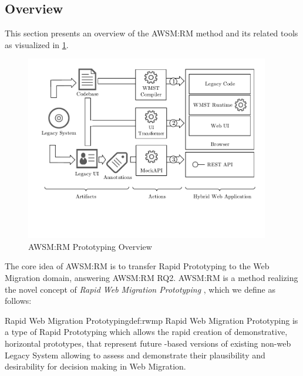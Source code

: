 \vspace{-10pt}
\hypertarget{sec:rwmp.overview}{%
\subsection{Overview}\label{sec:rwmp.overview}}
\vspace{10pt}

This section presents an overview of the AWSM:RM method and its related tools as visualized in \cref{fig:awsm.rm.overview}.

\begin{figure}[h!]
\hypertarget{fig:awsm.rm.overview}{%
\centering
\includegraphics[width=0.95\textwidth]{../figures/rewamp/wms3.pdf}
\caption{AWSM:RM Prototyping Overview}\label{fig:awsm.rm.overview}
}
\end{figure}

The core idea of AWSM:RM is to transfer \gls{Rapid Prototyping} to the \gls{Web Migration} domain, answering AWSM:RM RQ2.
AWSM:RM is a method realizing the novel concept of \emph{\gls{Rapid Web Migration Prototyping}} \autocite{Heil2018ReWaMP}, which we define as follows:

\begin{thesisdefinition}{Rapid Web Migration Prototyping}{def:rwmp}
Rapid Web Migration Prototyping is a type of \gls{Rapid Prototyping} which allows the rapid creation of demonstrative, horizontal prototypes, that represent future -based versions of existing non-\gls{web} \gls{Legacy System} allowing to assess and demonstrate their plausibility and desirability for decision making in \gls{Web Migration}.
\end{thesisdefinition}

